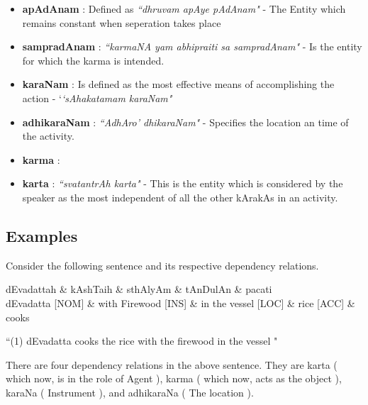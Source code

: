 \documentclass[twoside]{article}
\begin{document}
  \begin{itemize}
    \item \textbf{apAdAnam}  :  Defined as \textit{``dhruvam apAye pAdAnam"} - The Entity which remains constant when seperation takes place
    \item \textbf{sampradAnam}  : \textit{``karmaNA yam abhipraiti sa sampradAnam"} - Is the entity for which the karma is intended. 
    \item \textbf{karaNam} : Is defined as the most effective means of accomplishing the action - `\textit{`sAhakatamam karaNam"}
    \item \textbf{adhikaraNam} : \textit{``AdhAro' dhikaraNam"} - Specifies the location an time of the activity.
    \item \textbf{karma} :  
    \item \textbf{karta} : \textit{``svatantrAh karta"} - This is the entity which is considered by the speaker as the most independent of all the other kArakAs in an activity.
  \end{itemize}

\subsection{Examples}
Consider the following sentence and its respective dependency relations.

\hypertarget{fig1}{}
\begin{center}
\begin{dependency}[arc edge, arc angle=80, text only label, label style={above}]
   \begin{deptext}[column sep=1em]
      dEvadattah \& kAshTaih \& sthAlyAm \& tAnDulAn \& pacati \\
      dEvadatta [NOM] \& with Firewood [INS] \& in the vessel [LOC] \& rice [ACC]  \& cooks \\
   \end{deptext}
   
\end{dependency} 

 ``(1) dEvadatta cooks the rice with the firewood in the vessel " 
 

\end{center}

There are four dependency relations in the above sentence. They are karta ( which now, is in the role of Agent ), karma ( which now, acts as the object ), karaNa ( Instrument ), and adhikaraNa ( The location ).
\end{document}
